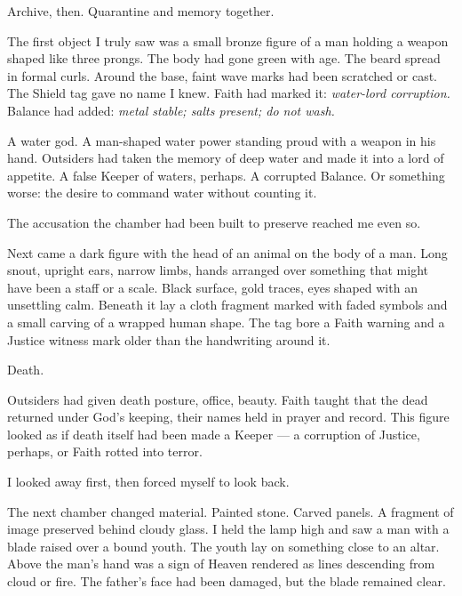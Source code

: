 Archive, then. Quarantine and memory together.\par

The first object I truly saw was a small bronze figure of a man holding a weapon shaped like three prongs. The body had gone green with age. The beard spread in formal curls. Around the base, faint wave marks had been scratched or cast. The Shield tag gave no name I knew. Faith had marked it: \textit{water-lord corruption.} Balance had added: \textit{metal stable; salts present; do not wash.}\par

A water god. A man-shaped water power standing proud with a weapon in his hand. Outsiders had taken the memory of deep water and made it into a lord of appetite. A false Keeper of waters, perhaps. A corrupted Balance. Or something worse: the desire to command water without counting it.\par

The accusation the chamber had been built to preserve reached me even so.\par

Next came a dark figure with the head of an animal on the body of a man. Long snout, upright ears, narrow limbs, hands arranged over something that might have been a staff or a scale. Black surface, gold traces, eyes shaped with an unsettling calm. Beneath it lay a cloth fragment marked with faded symbols and a small carving of a wrapped human shape. The tag bore a Faith warning and a Justice witness mark older than the handwriting around it.\par

Death.\par

Outsiders had given death posture, office, beauty. Faith taught that the dead returned under God's keeping, their names held in prayer and record. This figure looked as if death itself had been made a Keeper --- a corruption of Justice, perhaps, or Faith rotted into terror.\par

I looked away first, then forced myself to look back.\par

The next chamber changed material. Painted stone. Carved panels. A fragment of image preserved behind cloudy glass. I held the lamp high and saw a man with a blade raised over a bound youth. The youth lay on something close to an altar. Above the man's hand was a sign of Heaven rendered as lines descending from cloud or fire. The father's face had been damaged, but the blade remained clear.\par

